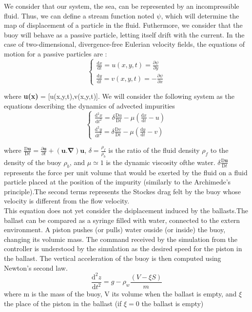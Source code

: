 \documentclass[a4paper]{report}
\begin{document}
We consider that our system, the sea, can be represented by an incompressible fluid. Thus, we can define a stream function noted $\psi$, which will determine the map of displacement of a particle in the fluid.
Futhermore, we consider that the buoy will behave as a passive particle, letting itself drift with the current.
In the case of two-dimensional, divergence-free Eulerian velocity fields, the equations of motion for a passive particles are : \begin{equation}
\left\{\begin{matrix}
\frac{\mathrm{d} x}{\mathrm{d} t}= u(x,y,t)=\frac{\partial \psi }{\partial y}\\ 
\frac{\mathrm{d} y}{\mathrm{d} t}= v(x,y,t)=-\frac{\partial \psi }{\partial x}
\end{matrix}\right.
\end{equation}

where \textbf{u(x)} = [u(x,y,t),v(x,y,t)].
We will consider the following system as the equations describing the dynamics of advected impurities
\begin{equation}
\left\{\begin{matrix}
\frac{\mathrm{d^2} x}{\mathrm{d} t^2}= \delta \frac{\mathrm{D} u}{\mathrm{D} t} -\mu (\frac{\mathrm{d} x }{\mathrm{d} t}-u)\\ 
\frac{\mathrm{d^2} y}{\mathrm{d} t^2}= \delta \frac{\mathrm{D} v}{\mathrm{D} t} -\mu (\frac{\mathrm{d} y}{\mathrm{d} t}-v)
\end{matrix}\right.
\end{equation}

where 
$
\frac{\mathrm{D} \mathbf{u}}{\mathrm{D} t} = \frac{\partial \mathbf{u} }{\partial t}+\mathbf{(u. \nabla )u}
$,
$\delta = \frac{\rho_f}{\rho_b}$
is the ratio of the fluid density $\rho_f$ to the density of the buoy $\rho_b$, and
$\mu \simeq 1$ is the dynamic viscosity ofthe water.
$\delta \frac{\mathrm{D} \mathbf{u}}{\mathrm{D} t}$ represents the force per unit volume that would be exerted by the fluid on a fluid particle placed at the position of the impurity (similarly to the Archimede's principle).The second terms represents the Stockes drag felt by the buoy whose velocity is different from the flow velocity.\\

This equation does not yet consider the dsiplacement induced by the ballasts.The ballast can be compared as a syringe filled with water, connected to the extern environment. A piston pushes (or pulls) water ouside (or inside) the buoy, changing its volumic mass.
The command received by the simulation from the controller is understood by the simulation as the desired speed for the piston in the ballast.
The vertical acceleration of the buoy is then computed using Newton's second law.\\
\begin{equation}
\frac{\mathrm{d^2} z}{\mathrm{d} t^2}= g-\rho_w \frac {\left ( V-\xi S \right )}{m}
\end{equation}
where m is the mass of the buoy, V its volume when the ballast is empty, and $\xi$ the place of the piston in the ballast (if $\xi = 0$ the ballast is empty)
\end{document}
